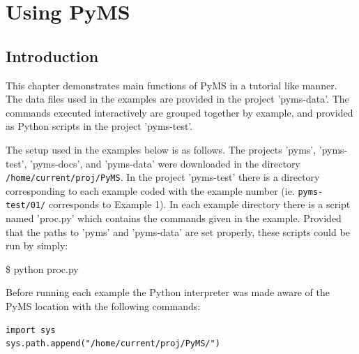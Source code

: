 

\chapter{Using PyMS}

\section{Introduction}

This chapter demonstrates main functions of PyMS in a tutorial like manner.
The data files used in the examples are provided in the project 'pyms-data'.
The commands executed interactively are grouped together by example, and
provided as Python scripts in the project 'pyms-test'.

The setup used in the examples below is as follows. The projects 'pyms',
'pyms-test', 'pyms-docs', and 'pyms-data' were downloaded in the directory
{\tt /home/current/proj/PyMS}. In the project 'pyms-test' there is a directory
corresponding to each example coded with the example number (ie.
{\tt pyms-test/01/} corresponds to Example 1). In each example directory
there is a script named 'proc.py' which contains the commands given in
the example. Provided that the paths to 'pyms' and 'pyms-data' are set
properly, these scripts could be run by simply:

\$ python proc.py

Before running each example the Python interpreter was made aware of the
PyMS location with the following commands:

\begin{verbatim}
import sys
sys.path.append("/home/current/proj/PyMS/")
\end{verbatim}

